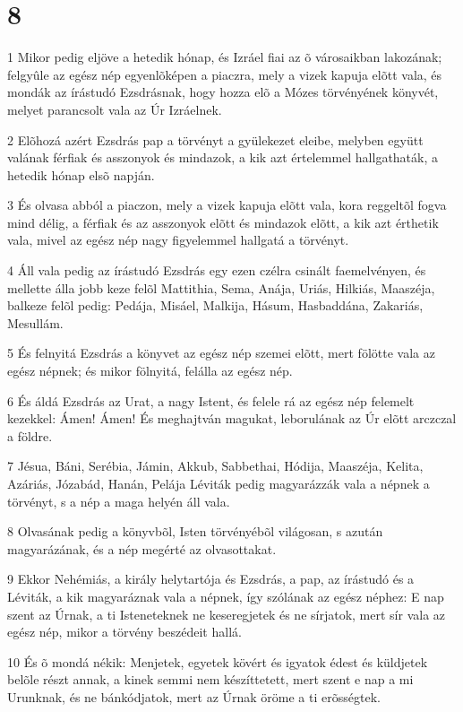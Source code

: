 \chapter{8}

\par 1 Mikor pedig eljöve a hetedik hónap, és Izráel fiai az õ városaikban lakozának; felgyûle az egész nép egyenlõképen a piaczra, mely a vizek kapuja elõtt vala, és mondák az írástudó Ezsdrásnak, hogy hozza elõ a Mózes törvényének könyvét, melyet parancsolt vala az Úr Izráelnek.
\par 2 Elõhozá azért Ezsdrás pap a törvényt a gyülekezet eleibe, melyben együtt valának férfiak és asszonyok és mindazok, a kik azt értelemmel hallgathaták, a hetedik hónap elsõ napján.
\par 3 És olvasa abból a piaczon, mely a vizek kapuja elõtt vala, kora reggeltõl fogva mind délig, a férfiak és az asszonyok elõtt és mindazok elõtt, a kik azt érthetik vala, mivel az egész nép nagy figyelemmel hallgatá a törvényt.
\par 4 Áll vala pedig az írástudó Ezsdrás egy ezen czélra csinált faemelvényen, és mellette álla jobb keze felõl Mattithia, Sema, Anája, Uriás, Hilkiás, Maaszéja, balkeze felõl pedig: Pedája, Misáel, Malkija, Hásum, Hasbaddána, Zakariás, Mesullám.
\par 5 És felnyitá Ezsdrás a könyvet az egész nép szemei elõtt, mert fölötte vala az egész népnek; és mikor fölnyitá, felálla az egész nép.
\par 6 És áldá Ezsdrás az Urat, a nagy Istent, és felele rá az egész nép felemelt kezekkel: Ámen! Ámen! És meghajtván magukat, leborulának az Úr elõtt arczczal a földre.
\par 7 Jésua, Báni, Serébia, Jámin, Akkub, Sabbethai, Hódija, Maaszéja, Kelita, Azáriás, Józabád, Hanán, Pelája Léviták pedig magyarázzák vala a népnek a törvényt, s a nép a maga helyén áll vala.
\par 8 Olvasának pedig a könyvbõl, Isten törvényébõl világosan, s azután magyarázának, és a nép megérté az olvasottakat.
\par 9 Ekkor Nehémiás, a király helytartója és Ezsdrás, a pap, az írástudó és a Léviták, a kik magyaráznak vala a népnek, így szólának az egész néphez: E nap szent az Úrnak, a ti Isteneteknek ne keseregjetek és ne sírjatok, mert sír vala az egész nép, mikor a törvény beszédeit hallá.
\par 10 És õ mondá nékik: Menjetek, egyetek kövért és igyatok édest és küldjetek belõle részt annak, a kinek semmi nem készíttetett, mert szent e nap a mi Urunknak, és ne bánkódjatok, mert az Úrnak öröme a ti erõsségtek.
